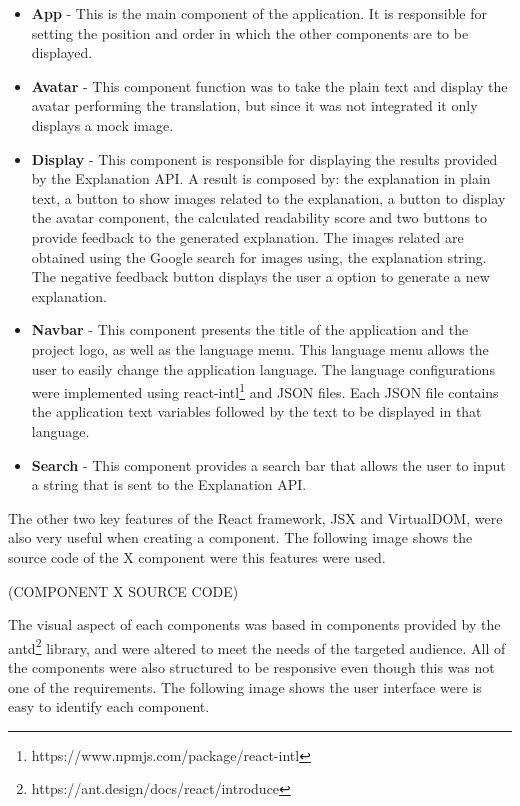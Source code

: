 \begin{itemize}
    \item \textbf{App} - This is the main component of the application.
        It is responsible for setting the position and order in which the other components are to be displayed.
    \item \textbf{Avatar} - This component function was to take the plain text and display the avatar performing the translation, but since it was not integrated it only displays a mock image.
    \item \textbf{Display} - This component is responsible for displaying the results provided by the Explanation API.
        A result is composed by: the explanation in plain text, a button to show images related to the explanation, a button to display the avatar component, the calculated readability score and two buttons to provide feedback to the generated explanation.
        The images related are obtained using the Google search for images using, the explanation string.
        The negative feedback button displays the user a option to generate a new explanation.
    \item \textbf{Navbar} - This component presents the title of the application and the project logo, as well as the language menu.
        This language menu allows the user to easily change the application language.
        The language configurations were implemented using react-intl\footnote{https://www.npmjs.com/package/react-intl} and JSON files.
        Each JSON file contains the application text variables followed by the text to be displayed in that language.
    \item \textbf{Search} - This component provides a search bar that allows the user to input a string that is sent to the Explanation API.
\end{itemize}

The other two key features of the React framework, JSX and VirtualDOM, were also very useful when creating a component.
The following image shows the source code of the X component were this features were used. %

(COMPONENT X SOURCE CODE) %

The visual aspect of each components was based in components provided by the antd\footnote{https://ant.design/docs/react/introduce} library, and were altered to meet the needs of the targeted audience.
All of the components were also structured to be responsive even though this was not one of the requirements.
The following image shows the user interface were is easy to identify each component.

